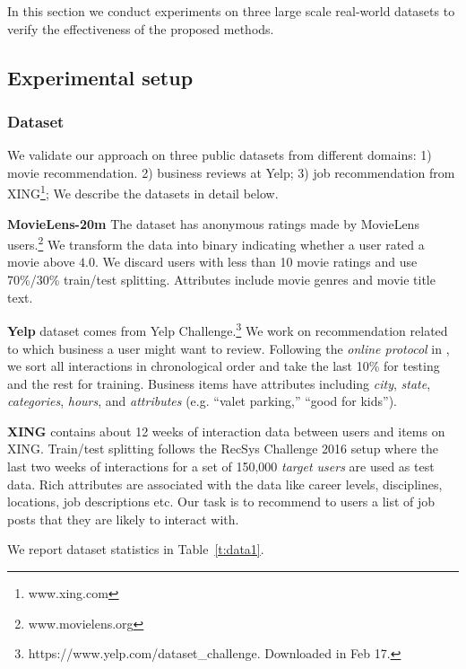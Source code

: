 \documentclass[letterpaper]{article}
\begin{document}
In this section we conduct experiments on three large scale real-world datasets to verify the effectiveness of the proposed methods.

\subsection{Experimental setup}
\subsubsection{Dataset}

We validate our approach on three public datasets from different domains: 1) movie recommendation. 2) business reviews at Yelp; 3) job recommendation from XING\footnote{www.xing.com}; We describe the datasets in detail below.

\noindent\textbf{MovieLens-20m} The dataset has anonymous ratings made by MovieLens users.\footnote{www.movielens.org} We transform the data into binary indicating whether a user rated a movie above $4.0$. We discard users with less than 10 movie ratings and use 70\%/30\% train/test splitting. Attributes include movie genres and movie title text.

\noindent\textbf{Yelp} dataset comes from Yelp Challenge.\footnote{https://www.yelp.com/dataset\_challenge. Downloaded in Feb 17.} We work on recommendation related to which business a user might want to review. Following the \textit{online protocol} in \cite{he2016fast}, we sort all interactions in chronological order and take the last 10\% for testing and the rest for training. Business items have attributes including \textit{city}, \textit{state}, \textit{categories}, \textit{hours}, and \textit{attributes} (e.g. ``valet parking,'' ``good for kids'').

\noindent\textbf{XING} contains about 12 weeks of interaction data between users and items on XING. Train/test splitting follows the RecSys Challenge 2016 \cite{abel2016recsys} setup where the last two weeks of interactions for a set of 150,000 \textit{target users} are used as test data. Rich attributes are associated with the data like career levels, disciplines, locations, job descriptions etc. Our task is to recommend to users a list of job posts that they are likely to interact with.

We report dataset statistics in Table~\ref{t:data1}.
\end{document}
